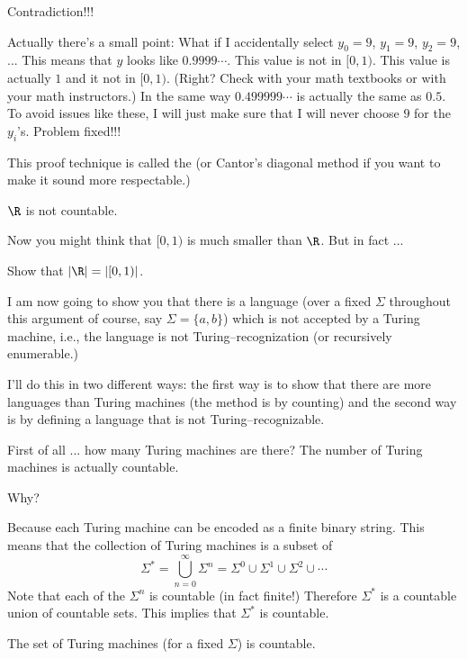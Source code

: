 Contradiction!!!

Actually there's a small point:
What if I accidentally select $y_0 = 9$, $y_1 = 9$, $y_2 = 9$, ...
This means that $y$ looks like $0.9999\cdots$.
This value is not in $[0,1)$.
This value is actually $1$ and it not in $[0,1)$.
(Right? Check with your math textbooks or with your math instructors.)
In the same way $0.499999\cdots$ is actually the same as
$0.5$.
To avoid issues like these, I will just make sure that I will never choose
$9$ for the $y_i$'s.
Problem fixed!!!

This proof technique is called the 
(or Cantor's diagonal method if you want to make it sound more respectable.)

\begin{thm}
$\R$ is not countable.
\end{thm}

Now you might think that $[0,1)$ is much smaller than $\R$.
But in fact ...

\begin{ex}
Show that $|\R| = |[0, 1)|$.
\end{ex}

I am now going to show you that there is a language
(over a fixed $\Sigma$ throughout this argument of course, 
say $\Sigma = \{a,b\}$)
which is not accepted by a Turing machine, i.e.,
the language is not Turing--recognization (or recursively enumerable.)

I'll do this in two different ways:
the first way is to show that there
are more languages than Turing machines (the method is by counting)
and the second way is by defining a language that is not Turing--recognizable.

First of all ... how many Turing machines are there?
The number of Turing machines is actually countable.

Why?

Because each Turing machine can be encoded as a finite binary string.
This means that the collection of Turing machines
is a subset of 
\[
\Sigma^* 
= \bigcup_{n=0}^\infty \Sigma^n 
= \Sigma^0 \cup \Sigma^1 \cup \Sigma^2 \cup \cdots
\]
Note that each of the $\Sigma^n$ is countable (in fact finite!)
Therefore $\Sigma^*$ is a countable union of countable sets.
This implies that $\Sigma^*$ is countable.

\begin{thm}
The set of Turing machines (for a fixed $\Sigma$) is countable.
\end{thm}

